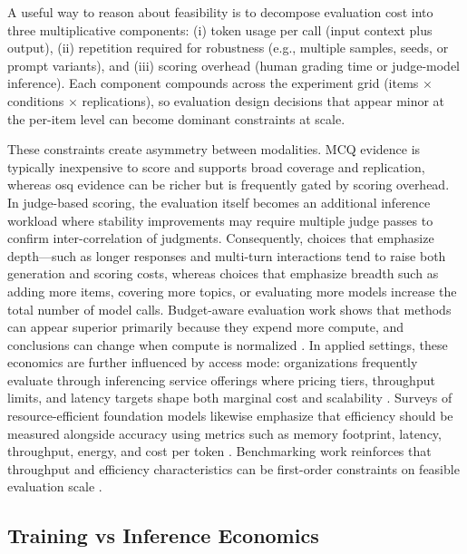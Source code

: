 A useful way to reason about feasibility is to decompose evaluation cost into three multiplicative components: (i) token usage per call (input context plus output), (ii) repetition required for robustness (e.g., multiple samples, seeds, or prompt variants), and (iii) scoring overhead (human grading time or judge-model inference). Each component compounds across the experiment grid (items $\times$ conditions $\times$ replications), so evaluation design decisions that appear minor at the per-item level can become dominant constraints at scale.

These constraints create asymmetry between modalities. MCQ evidence is typically inexpensive to score and supports broad coverage and replication, whereas \ac{osq} evidence can be richer but is frequently gated by scoring overhead. In judge-based scoring, the evaluation itself becomes an additional inference workload where stability improvements may require multiple judge passes to confirm inter-correlation of judgments. Consequently, choices that emphasize depth—such as longer responses and multi-turn interactions tend to raise both generation and scoring costs, whereas choices that emphasize breadth such as adding more items, covering more topics, or evaluating more models increase the total number of model calls. Budget-aware evaluation work shows that methods can appear superior primarily because they expend more compute, and conclusions can change when compute is normalized \cite{Junlin_Wang_2024_Budget_Aware_Reasoning}. In applied settings, these economics are further influenced by access mode: organizations frequently evaluate through inferencing service offerings where pricing tiers, throughput limits, and latency targets shape both marginal cost and scalability \cite{liagkou_CostPerspectiveAdoptingLarge_2024}. Surveys of resource-efficient foundation models likewise emphasize that efficiency should be measured alongside accuracy using metrics such as memory footprint, latency, throughput, energy, and cost per token \cite{xu_SurveyResourceefficientLLMMultimodal_2024, bai_EfficiencySystematicSurveyResourceEfficient_2024}. Benchmarking work reinforces that throughput and efficiency characteristics can be first-order constraints on feasible evaluation scale \cite{Siddharth_Samsi_2023}.


\subsection{Training vs Inference Economics}
\label{subsec:ch2_train_vs_infer_cost}

